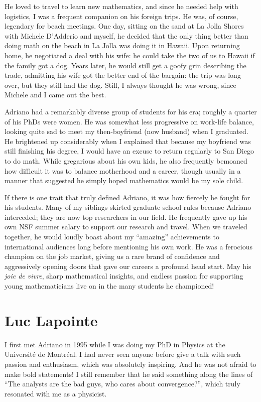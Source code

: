 \documentclass{amsart}
\begin{document}
He loved to travel to learn new mathematics, and since he needed help with logistics, I was a frequent companion on his foreign trips. He was, of course, legendary for beach meetings. One day, sitting on the sand at La Jolla Shores with Michele D’Adderio and myself, he decided that the only thing better than doing math on the beach in La Jolla was doing it in Hawaii. Upon returning home, he negotiated a deal with his wife: he could take the two of us to Hawaii if the family got a dog. Years later, he would still get a goofy grin describing the trade, admitting his wife got the better end of the bargain: the trip was long over, but they still had the dog. Still, I always thought he was wrong, since Michele and I came out the best. 

Adriano had a remarkably diverse group of students for his era; roughly a quarter of his PhDs were women. He was somewhat less progressive on work-life balance, looking quite sad to meet my then-boyfriend (now husband) when I graduated. He brightened up considerably when I explained that because my boyfriend was still finishing his degree, I would have an excuse to return regularly to San Diego to do math. While gregarious about his own kids, he also frequently bemoaned how difficult it was to balance motherhood and a career, though usually in a manner that suggested he simply hoped mathematics would be my sole child.

If there is one trait that truly defined Adriano, it was how fiercely he fought for his students. Many of my siblings skirted graduate school rules because Adriano interceded; they are now top researchers in our field. He frequently gave up his own NSF summer salary to support our research and travel. When we traveled together, he would loudly boast about my ``amazing'' achievements to international audiences long before mentioning his own work. He was a ferocious champion on the job market, giving us a rare brand of confidence and aggressively opening doors that gave our careers a profound head start. May his {\em joie de vivre}, sharp mathematical insights, and endless passion for supporting young mathematicians live on in the many students he championed!

\section*{Luc Lapointe}
I first met Adriano in 1995 while I was doing my PhD in Physics at the Université de Montréal.
I had never seen anyone before give a talk with such passion and enthusiasm, which was absolutely inspiring.
And he was not afraid to make bold statements! I still remember that he said something along the lines of ``The analysts are the bad guys, who cares about convergence?'', which truly resonated with me as a physicist.
\end{document}
